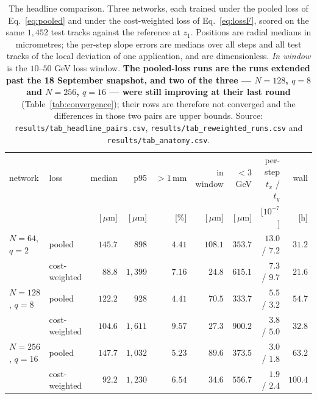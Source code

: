 \documentclass[11pt,a4paper]{article}
\newcommand{\um}{\ensuremath{\,\mu\mathrm{m}}}
\newcommand{\mm}{\ensuremath{\,\mathrm{mm}}}
\begin{document}
\begin{table}[tbp]
  \centering
  \caption{The headline comparison. Three networks, each trained under the
  pooled loss of Eq.~\eqref{eq:pooled} and under the cost-weighted loss of
  Eq.~\eqref{eq:lossF}, scored on the same $1{,}452$ test tracks against the
  reference at $z_1$. Positions are radial medians in micrometres; the per-step
  slope errors are medians over all steps and all test tracks of the local
  deviation of one application, and are dimensionless. \emph{In window} is the
  $10$--$50$ GeV loss window. \textbf{The pooled-loss runs are the runs extended
  past the 18 September snapshot, and two of the three --- $N = 128$, $q = 8$
  and $N = 256$, $q = 16$ --- were still improving at their last round}
  (Table~\ref{tab:convergence}); their rows are therefore not converged and the
  differences in those two pairs are upper bounds. Source:
  \texttt{results/tab\_headline\_pairs.csv},
  \texttt{results/tab\_reweighted\_runs.csv} and
  \texttt{results/tab\_anatomy.csv}.}
  \label{tab:headline}
  \footnotesize
  \setlength{\tabcolsep}{3pt}
  \begin{tabular}{llrrrrrrr}
    \toprule
    network & loss & median & p95 & $>1\mm$ & in window & $<3$ GeV &
    per-step $t_x$ / $t_y$ & wall \\
    & & [\!\um] & [\!\um] & [\%] & [\!\um] & [\!\um] & [$10^{-7}$] & [h] \\
    \midrule
    $N = 64$, $q = 2$ & pooled        & $145.7$ & $\phantom{0}898$   & $4.41$ & $108.1$ & $353.7$ & $13.0$ / $7.2$ & $31.2$ \\
                      & cost-weighted & $\mathbf{88.8}$  & $1{,}399$ & $7.16$ & $\mathbf{24.8}$  & $615.1$ & $\phantom{0}7.3$ / $9.7$ & $21.6$ \\
    \addlinespace
    $N = 128$, $q = 8$ & pooled        & $122.2$ & $\phantom{0}928$   & $4.41$ & $70.5$ & $333.7$ & $\phantom{0}5.5$ / $3.2$ & $54.7$ \\
                       & cost-weighted & $104.6$ & $1{,}611$ & $9.57$ & $27.3$ & $900.2$ & $\phantom{0}3.8$ / $5.0$ & $32.8$ \\
    \addlinespace
    $N = 256$, $q = 16$ & pooled        & $147.7$ & $1{,}032$ & $5.23$ & $89.6$ & $373.5$ & $\phantom{0}3.0$ / $1.8$ & $63.2$ \\
                        & cost-weighted & $92.2$  & $1{,}230$ & $6.54$ & $34.6$ & $556.7$ & $\phantom{0}1.9$ / $2.4$ & $100.4$ \\
    \bottomrule
  \end{tabular}
\end{table}
\end{document}
